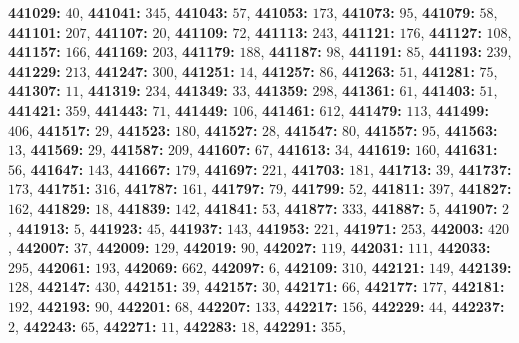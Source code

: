 \textsf{\bfseries 441029:} $40$, \textsf{\bfseries 441041:} $345$, \textsf{\bfseries 441043:} $57$, \textsf{\bfseries 441053:} $173$, \textsf{\bfseries 441073:} $95$, \textsf{\bfseries 441079:} $58$, \textsf{\bfseries 441101:} $207$, \textsf{\bfseries 441107:} $20$, \textsf{\bfseries 441109:} $72$, \textsf{\bfseries 441113:} $243$, \textsf{\bfseries 441121:} $176$, \textsf{\bfseries 441127:} $108$, \textsf{\bfseries 441157:} $166$, \textsf{\bfseries 441169:} $203$, \textsf{\bfseries 441179:} $188$, \textsf{\bfseries 441187:} $98$, \textsf{\bfseries 441191:} $85$, \textsf{\bfseries 441193:} $239$, \textsf{\bfseries 441229:} $213$, \textsf{\bfseries 441247:} $300$, \textsf{\bfseries 441251:} $14$, \textsf{\bfseries 441257:} $86$, \textsf{\bfseries 441263:} $51$, \textsf{\bfseries 441281:} $75$, \textsf{\bfseries 441307:} $11$, \textsf{\bfseries 441319:} $234$, \textsf{\bfseries 441349:} $33$, \textsf{\bfseries 441359:} $298$, \textsf{\bfseries 441361:} $61$, \textsf{\bfseries 441403:} $51$, \textsf{\bfseries 441421:} $359$, \textsf{\bfseries 441443:} $71$, \textsf{\bfseries 441449:} $106$, \textsf{\bfseries 441461:} $612$, \textsf{\bfseries 441479:} $113$, \textsf{\bfseries 441499:} $406$, \textsf{\bfseries 441517:} $29$, \textsf{\bfseries 441523:} $180$, \textsf{\bfseries 441527:} $28$, \textsf{\bfseries 441547:} $80$, \textsf{\bfseries 441557:} $95$, \textsf{\bfseries 441563:} $13$, \textsf{\bfseries 441569:} $29$, \textsf{\bfseries 441587:} $209$, \textsf{\bfseries 441607:} $67$, \textsf{\bfseries 441613:} $34$, \textsf{\bfseries 441619:} $160$, \textsf{\bfseries 441631:} $56$, \textsf{\bfseries 441647:} $143$, \textsf{\bfseries 441667:} $179$, \textsf{\bfseries 441697:} $221$, \textsf{\bfseries 441703:} $181$, \textsf{\bfseries 441713:} $39$, \textsf{\bfseries 441737:} $173$, \textsf{\bfseries 441751:} $316$, \textsf{\bfseries 441787:} $161$, \textsf{\bfseries 441797:} $79$, \textsf{\bfseries 441799:} $52$, \textsf{\bfseries 441811:} $397$, \textsf{\bfseries 441827:} $162$, \textsf{\bfseries 441829:} $18$, \textsf{\bfseries 441839:} $142$, \textsf{\bfseries 441841:} $53$, \textsf{\bfseries 441877:} $333$, \textsf{\bfseries 441887:} $5$, \textsf{\bfseries 441907:} $2$, \textsf{\bfseries 441913:} $5$, \textsf{\bfseries 441923:} $45$, \textsf{\bfseries 441937:} $143$, \textsf{\bfseries 441953:} $221$, \textsf{\bfseries 441971:} $253$, \textsf{\bfseries 442003:} $420$, \textsf{\bfseries 442007:} $37$, \textsf{\bfseries 442009:} $129$, \textsf{\bfseries 442019:} $90$, \textsf{\bfseries 442027:} $119$, \textsf{\bfseries 442031:} $111$, \textsf{\bfseries 442033:} $295$, \textsf{\bfseries 442061:} $193$, \textsf{\bfseries 442069:} $662$, \textsf{\bfseries 442097:} $6$, \textsf{\bfseries 442109:} $310$, \textsf{\bfseries 442121:} $149$, \textsf{\bfseries 442139:} $128$, \textsf{\bfseries 442147:} $430$, \textsf{\bfseries 442151:} $39$, \textsf{\bfseries 442157:} $30$, \textsf{\bfseries 442171:} $66$, \textsf{\bfseries 442177:} $177$, \textsf{\bfseries 442181:} $192$, \textsf{\bfseries 442193:} $90$, \textsf{\bfseries 442201:} $68$, \textsf{\bfseries 442207:} $133$, \textsf{\bfseries 442217:} $156$, \textsf{\bfseries 442229:} $44$, \textsf{\bfseries 442237:} $2$, \textsf{\bfseries 442243:} $65$, \textsf{\bfseries 442271:} $11$, \textsf{\bfseries 442283:} $18$, \textsf{\bfseries 442291:} $355$, 
